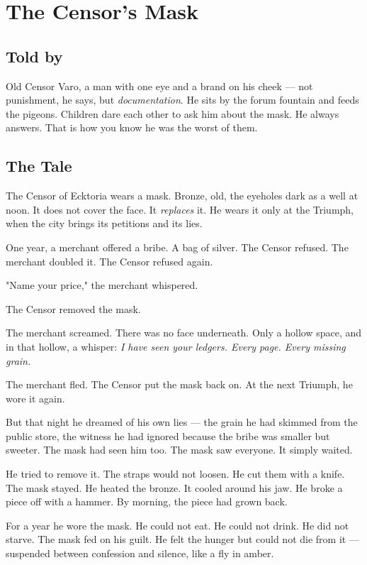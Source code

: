 \chapter{The Censor's Mask}

\section*{Told by}
Old Censor Varo, a man with one eye and a brand on his cheek — not punishment, he says, but \textit{documentation}. He sits by the forum fountain and feeds the pigeons. Children dare each other to ask him about the mask. He always answers. That is how you know he was the worst of them.

\section*{The Tale}

The Censor of Ecktoria wears a mask. Bronze, old, the eyeholes dark as a well at noon. It does not cover the face. It \textit{replaces} it. He wears it only at the Triumph, when the city brings its petitions and its lies.

One year, a merchant offered a bribe. A bag of silver. The Censor refused. The merchant doubled it. The Censor refused again.

"Name your price," the merchant whispered.

The Censor removed the mask.

The merchant screamed. There was no face underneath. Only a hollow space, and in that hollow, a whisper: \textit{I have seen your ledgers. Every page. Every missing grain.}

The merchant fled. The Censor put the mask back on. At the next Triumph, he wore it again.

But that night he dreamed of his own lies — the grain he had skimmed from the public store, the witness he had ignored because the bribe was smaller but sweeter. The mask had seen him too. The mask saw everyone. It simply waited.

He tried to remove it. The straps would not loosen. He cut them with a knife. The mask stayed. He heated the bronze. It cooled around his jaw. He broke a piece off with a hammer. By morning, the piece had grown back.

For a year he wore the mask. He could not eat. He could not drink. He did not starve. The mask fed on his guilt. He felt the hunger but could not die from it — suspended between confession and silence, like a fly in amber.

